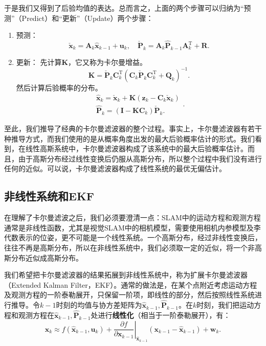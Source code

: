 于是我们又得到了后验均值的表达。总而言之，上面的两个步骤可以归纳为“预测”（Predict）和“更新”（Update）两个步骤：

\begin{mdframed}
\begin{enumerate}
	\item 预测：
	\begin{equation}
	\check{\bm{x}}_k = {\bm{A}_k {{\hat{\bm{x}}}_{k - 1}} + {\bm{u}_k}}, \quad \check{\bm{P}}_k = {\bm{A}_k \hat{\bm{P}}_{k-1} { \bm{A}^\mathrm{T}_k} + \bm{R}}.
	\end{equation}
	\item 更新：
	先计算$\bm{K}$，它又称为卡尔曼增益。
	\begin{equation}
	\label{eq:kalman-K-another}
	\bm{K} = {{\check {\bm{P}}}_k} \bm{C}_k^\mathrm{T} {\left( {{\bm{C}_k}{{\check {\bm{P}}}_k}\bm{C}_k^\mathrm{T} + {\bm{Q}_k}} \right)^{ - 1}}.
	\end{equation}
	然后计算后验概率的分布。
	\begin{equation}
	\begin{array}{l}
	\hat {\bm{x}}_k = {{\check {\bm{x}}}_k} + \bm{K} \left( {\bm{z}_k - {\bm{C}_k}{\bm{\check{x}}_k}} \right)\\
	{{\bm{\hat {P}}}_k} = \left( {\bm{I} - \bm{K}{\bm{C}_k}} \right) \check{\bm{P}}_k.
	\end{array}.
	\end{equation}
\end{enumerate}
\end{mdframed}

至此，我们推导了经典的卡尔曼滤波器的整个过程。事实上，卡尔曼滤波器有若干种推导方式，而我们使用的是从概率角度出发的最大后验概率估计的形式。我们看到，在线性高斯系统中，卡尔曼滤波器构成了该系统中的最大后验概率估计。而且，由于高斯分布经过线性变换后仍服从高斯分布，所以整个过程中我们没有进行任何的近似。可以说，卡尔曼滤波器构成了线性系统的最优无偏估计。

\subsection{非线性系统和EKF}
在理解了卡尔曼滤波之后，我们必须要澄清一点：SLAM中的运动方程和观测方程通常是非线性函数，尤其是视觉SLAM中的相机模型，需要使用相机内参模型及李代数表示的位姿，更不可能是一个线性系统。一个高斯分布，经过非线性变换后，往往不再是高斯分布，所以在非线性系统中，我们必须取一定的近似，将一个非高斯分布近似成高斯分布。

我们希望把卡尔曼滤波器的结果拓展到非线性系统中，称为扩展卡尔曼滤波器（Extended Kalman Filter，EKF）。通常的做法是，在某个点附近考虑运动方程及观测方程的一阶泰勒展开，只保留一阶项，即线性的部分，然后按照线性系统进行推导。令$k-1$时刻的均值与协方差矩阵为$\bm{\hat{x}}_{k-1},\bm{\hat{P}}_{k-1}$。在$k$时刻，我们把运动方程和观测方程在$\bm{\hat{x}}_{k-1},\bm{\hat{P}}_{k-1}$处进行\textbf{线性化}（相当于一阶泰勒展开），有：
\begin{equation}
{\bm{x}_k} \approx f\left( {{{\bm{\hat x}}_{k - 1}},{\bm{u}_k}} \right) + {\left. {\frac{{\partial f}}{{\partial {\bm{x}_{k - 1}}}}} \right|_{{{\bm{\hat x}}_{k - 1}}}}\left( {{\bm{x}_{k - 1}} - {{\bm{\hat x}}_{k - 1}}} \right) + {\bm{w}_k}.
\end{equation}

